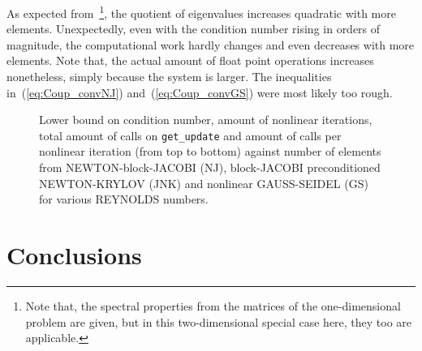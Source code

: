 \documentclass[10pt, ngerman, english,
twoside, open=right,
numbers=noenddot,
declaration=section,
abstract=section,
abstract=multiple,
abstract=notoc,
declaration=notoc,
cd=pale, 
chapterprefix=off, 
chapterpage=false, 
headingsvskip=-10em,
cdgeometry=custom, 
slantedgreek=on,
cdmath=on, 
cdfont=on,
ttfont=false,
mathswap=off,
]{tudscrreprt}
\numberwithin{equation}{chapter}
\renewcommand{\textsc}[1]{\uppercase{\mbox{#1}}}
\begin{document}
As expected from~\cite[see][pp.~78-79]{DevilleFischer}\footnote{Note that, the spectral properties from the matrices of the one-dimensional problem are given, but in this two-dimensional special case here, they too are applicable.}, the quotient of eigenvalues increases quadratic with more elements.
Unexpectedly, even with the condition number rising in orders of magnitude, the computational work hardly changes and even decreases with more elements. Note that, the actual amount of float point operations increases nonetheless, simply because the system is larger. The inequalities in~(\ref{eq:Coup_convNJ}) and~(\ref{eq:Coup_convGS}) were most likely too rough.
\begin{figure}[!t]
\centering

\caption{Lower bound on condition number, amount of nonlinear iterations, total amount of calls on \texttt{get\_update} and amount of calls per nonlinear iteration (from top to bottom) against number of elements from \textsc{Newton}-block-\textsc{Jacobi} (NJ), block-\textsc{Jacobi} preconditioned \textsc{Newton}-\textsc{Krylov} (JNK) and nonlinear \textsc{Gau\ss}-\textsc{Seidel} (GS) for various \textsc{Reynolds} numbers.}\label{fig:Perf_convergenceN}
\end{figure}
\chapter{Conclusions}\label{sec:End}
\end{document}
